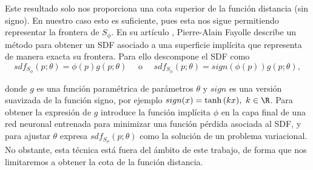 Este resultado solo nos proporciona una cota superior de la función distancia (sin signo). En nuestro caso esto es suficiente, pues esta nos sigue permitiendo representar la frontera de $S_{\phi}$. En su artículo \cite{art:impSdf}, Pierre-Alain Fayolle describe un método para obtener un SDF asociado a una superficie implícita que representa de manera exacta su frontera. Para ello descompone el SDF como 
\begin{equation*}
    sdf_{S_{\phi}}(p;\theta) = \phi(p)g(p;\theta)\quad \text{ o }\quad sdf_{S_{\phi}}(p;\theta) = sign(\phi(p))g(p;\theta),
\end{equation*}

donde $g$ es una función paramétrica de parámetros $\theta$ y $sign$ es una versión suavizada de la función signo, por ejemplo $sign(x) = \tanh{(kx)},\ k\in\R$. Para obtener la expresión de $g$ introduce la función implícita $\phi$ en la capa final de una red neuronal entrenada para  minimizar una función pérdida asociada al SDF, y para ajustar $\theta$ expresa $sdf_{S_{\phi}}(p;\theta)$ como la solución de un problema variacional. No obstante, esta técnica está fuera del ámbito de este trabajo, de forma que nos limitaremos a obtener la cota de la función distancia.